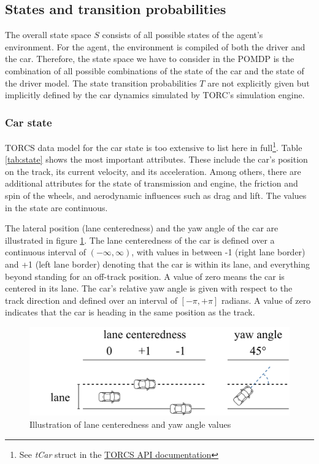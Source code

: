 \subsection{States and transition probabilities}

The overall state space $S$ consists of all possible states of the agent's environment. For the agent, the environment is compiled of both the driver and the car. Therefore, the state space we have to consider in the POMDP is the combination of all possible combinations of the state of the car and the state of the driver model. The state transition probabilities $T$ are not explicitly given but implicitly defined by the car dynamics simulated by TORC's simulation engine.

\subsubsection*{Car state}
\label{sec:state}

TORCS data model for the car state is too extensive to list here in full\footnote{See \emph{tCar} struct in the \href{https://sourceforge.net/projects/torcs/files/api-docs/}{TORCS API documentation}}. Table \ref{tab:state} shows the most important attributes. These include the car's position on the track, its current velocity, and its acceleration. Among others, there are additional attributes for the state of transmission and engine, the friction and spin of the wheels, and aerodynamic influences such as drag and lift. The values in the state are continuous. 



\noindent
The lateral position (lane centeredness) and the yaw angle of the car are illustrated in figure \ref{fig:observations}. The lane centeredness of the car is defined over a continuous interval of $(-\infty,\infty)$, with values in between -1 (right lane border) and +1 (left lane border) denoting that the car is within its lane, and everything beyond standing for an off-track position. A value of zero means the car is centered in its lane. The car's relative yaw angle is given with respect to the track direction and defined over an interval of $[-\pi, +\pi]$ radians. A value of zero indicates that the car is heading in the same position as the track.

\begin{figure}[htbp]
    \includegraphics[width=0.6\linewidth]{figures/angle_distance.pdf}
    \centering
    \caption{Illustration of lane centeredness and yaw angle values}
    \label{fig:observations}
\end{figure}

